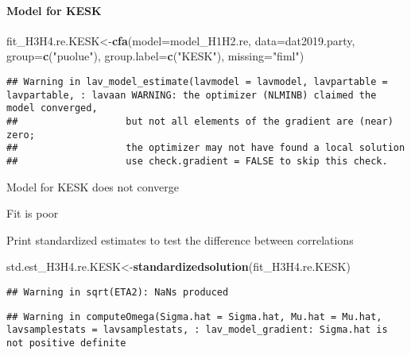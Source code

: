 \documentclass[
]{article}
\newenvironment{Shaded}{\begin{snugshade}}{\end{snugshade}}
\newcommand{\DataTypeTok}[1]{\textcolor[rgb]{0.13,0.29,0.53}{#1}}
\newcommand{\KeywordTok}[1]{\textcolor[rgb]{0.13,0.29,0.53}{\textbf{#1}}}
\newcommand{\NormalTok}[1]{#1}
\newcommand{\StringTok}[1]{\textcolor[rgb]{0.31,0.60,0.02}{#1}}
\begin{document}
\newpage

\hypertarget{model-for-kesk}{%
\paragraph{Model for KESK}\label{model-for-kesk}}

\begin{Shaded}
\begin{Highlighting}[]
\NormalTok{fit_H3H4.re.KESK<-}\KeywordTok{cfa}\NormalTok{(}\DataTypeTok{model=}\NormalTok{model_H1H2.re,}
                    \DataTypeTok{data=}\NormalTok{dat2019.party,}
                    \DataTypeTok{group=}\KeywordTok{c}\NormalTok{(}\StringTok{"puolue"}\NormalTok{),}
                    \DataTypeTok{group.label=}\KeywordTok{c}\NormalTok{(}\StringTok{"KESK"}\NormalTok{),}
                    \DataTypeTok{missing=}\StringTok{"fiml"}\NormalTok{)}
\end{Highlighting}
\end{Shaded}

\begin{verbatim}
## Warning in lav_model_estimate(lavmodel = lavmodel, lavpartable = lavpartable, : lavaan WARNING: the optimizer (NLMINB) claimed the model converged,
##                   but not all elements of the gradient are (near) zero;
##                   the optimizer may not have found a local solution
##                   use check.gradient = FALSE to skip this check.
\end{verbatim}

Model for KESK does not converge

Fit is poor

Print standardized estimates to test the difference between correlations

\begin{Shaded}
\begin{Highlighting}[]
\NormalTok{std.est_H3H4.re.KESK<-}\KeywordTok{standardizedsolution}\NormalTok{(fit_H3H4.re.KESK)}
\end{Highlighting}
\end{Shaded}

\begin{verbatim}
## Warning in sqrt(ETA2): NaNs produced
\end{verbatim}

\begin{verbatim}
## Warning in computeOmega(Sigma.hat = Sigma.hat, Mu.hat = Mu.hat, lavsamplestats = lavsamplestats, : lav_model_gradient: Sigma.hat is not positive definite
\end{verbatim}
\end{document}

